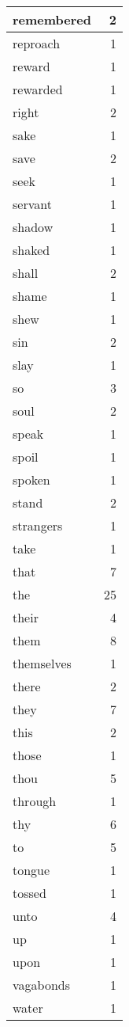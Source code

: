 \begin{center}
\begin{longtable}{l|r}
remembered & 2 \\ \hline
reproach & 1 \\ \hline
reward & 1 \\ \hline
rewarded & 1 \\ \hline
right & 2 \\ \hline
sake & 1 \\ \hline
save & 2 \\ \hline
seek & 1 \\ \hline
servant & 1 \\ \hline
shadow & 1 \\ \hline
shaked & 1 \\ \hline
shall & 2 \\ \hline
shame & 1 \\ \hline
shew & 1 \\ \hline
sin & 2 \\ \hline
slay & 1 \\ \hline
so & 3 \\ \hline
soul & 2 \\ \hline
speak & 1 \\ \hline
spoil & 1 \\ \hline
spoken & 1 \\ \hline
stand & 2 \\ \hline
strangers & 1 \\ \hline
take & 1 \\ \hline
that & 7 \\ \hline
the & 25 \\ \hline
their & 4 \\ \hline
them & 8 \\ \hline
themselves & 1 \\ \hline
there & 2 \\ \hline
they & 7 \\ \hline
this & 2 \\ \hline
those & 1 \\ \hline
thou & 5 \\ \hline
through & 1 \\ \hline
thy & 6 \\ \hline
to & 5 \\ \hline
tongue & 1 \\ \hline
tossed & 1 \\ \hline
unto & 4 \\ \hline
up & 1 \\ \hline
upon & 1 \\ \hline
vagabonds & 1 \\ \hline
water & 1 \\ \hline

\end{longtable}
\end{center}
